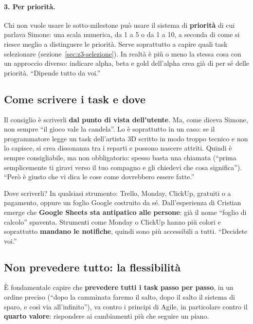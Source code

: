 \paragraph{3. Per priorità.} Chi non vuole usare le sotto-milestone può usare
il sistema di \textbf{priorità} di cui parlava Simone: una scala numerica, da
1 a 5 o da 1 a 10, a seconda di come si riesce meglio a distinguere le
priorità. Serve soprattutto a capire quali task selezionare
(sezione~\ref{sec:z3-selezione}). In realtà è più o meno la stessa cosa con un
approccio diverso: indicare alpha, beta e gold dell'alpha crea già di per sé
delle priorità. ``Dipende tutto da voi.''

\subsection{Come scrivere i task e dove}

Il consiglio è scriverli \textbf{dal punto di vista dell'utente}. Ma, come
diceva Simone, non sempre ``il gioco vale la candela''. Lo è soprattutto in
un caso: se il programmatore legge un task dell'artista 3D scritto in modo
troppo tecnico e non lo capisce, si crea dissonanza tra i reparti e possono
nascere attriti. Quindi è sempre consigliabile, ma non obbligatorio: spesso
basta una chiamata (``prima semplicemente ti giravi verso il tuo compagno e
gli chiedevi che cosa significa''). ``Però è giusto che vi dica le cose come
dovrebbero essere fatte.''

Dove scriverli? In qualsiasi strumento: Trello, Monday, ClickUp, gratuiti o a
pagamento, oppure un foglio Google costruito da sé. Dall'esperienza di
Cristian emerge che \textbf{Google Sheets sta antipatico alle persone}: già il
nome ``foglio di calcolo'' spaventa. Strumenti come Monday o ClickUp hanno più
colori e soprattutto \textbf{mandano le notifiche}, quindi sono più accessibili
a tutti. ``Decidete voi.''

\subsection{Non prevedere tutto: la flessibilità}

È fondamentale capire che \textbf{prevedere tutti i task passo per passo}, in
un ordine preciso (``dopo la camminata faremo il salto, dopo il salto il
sistema di sparo, e così via all'infinito''), va contro i principi di Agile,
in particolare contro il \textbf{quarto valore}: rispondere ai cambiamenti più
che seguire un piano.

